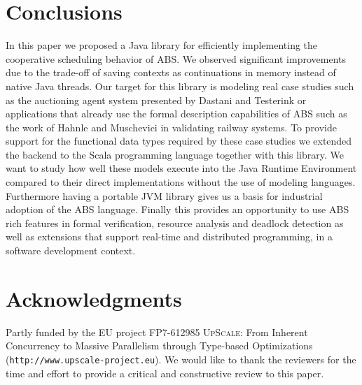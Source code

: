 \section{Conclusions}
\label{conc}
In this paper we proposed a Java library for efficiently implementing the cooperative scheduling behavior of ABS. We observed significant improvements due to the trade-off of saving contexts as continuations in memory instead of native Java threads. Our target for this library is modeling real case studies such as the auctioning agent system presented by Dastani and Testerink \cite{bas16}  or applications that already use the formal description capabilities of ABS such as the work of Hahnle and Muschevici in validating railway systems\cite{railway}. To provide support for the functional data types required by these case studies we extended the backend to the Scala programming language together with this library. We want to study how well these models execute into the Java Runtime Environment compared to their direct implementations without the use of modeling languages. Furthermore having a portable JVM library gives us a basis for industrial adoption of the ABS language.  Finally this provides an opportunity to use ABS rich features in formal verification,  resource analysis and deadlock detection as well as extensions that support real-time and distributed programming, in a software development context. 

\section{Acknowledgments}
Partly funded by the EU project FP7-612985
\textsc{UpScale}: From Inherent Concurrency to Massive Parallelism
through Type-based Optimizations \\ (\texttt{http:/$\!$/www.upscale-project.eu}). We would like to thank the reviewers for the time and effort to provide a critical and constructive review to this paper.
